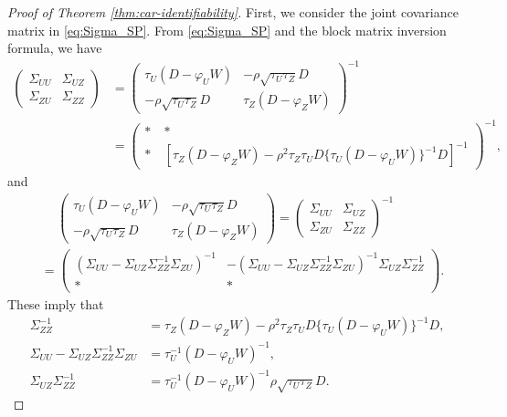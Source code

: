 \documentclass[11pt]{article}
\theoremstyle{definition}
\theoremstyle{remark}
\begin{document}
\begin{proof}[Proof of Theorem \ref{thm:car-identifiability}]
First, we consider the joint covariance matrix in \eqref{eq:Sigma_SP}. 
From \eqref{eq:Sigma_SP} and the block matrix inversion formula, we have 
\begin{align*}
\begin{pmatrix}
        \Sigma_{UU} & \Sigma_{UZ}\\
        \Sigma_{ZU} & \Sigma_{ZZ}
\end{pmatrix}
& = 
\begin{pmatrix} 
        \tau_U(D-\varphi_U W) & -\rho\sqrt{\tau_U\tau_Z} D \\
        -\rho\sqrt{\tau_U\tau_Z} D & \tau_Z(D-\varphi_Z W)
    \end{pmatrix}^{-1}\\
& = 
\begin{pmatrix} 
* \ & * \\
* \ & 
[ \tau_Z(D-\varphi_Z W) -  \rho^2\tau_Z\tau_U D \{ \tau_U(D-\varphi_U W) \}^{-1} D ]^{-1}
\end{pmatrix}^{-1},
\end{align*} 
and  
\begin{align*}
    & \quad \ 
    \begin{pmatrix} 
        \tau_U(D-\varphi_U W) & -\rho\sqrt{\tau_U\tau_Z} D \\
        -\rho\sqrt{\tau_U\tau_Z} D & \tau_Z(D-\varphi_Z W)
    \end{pmatrix}
    = 
    \begin{pmatrix}
        \Sigma_{UU} & \Sigma_{UZ}\\
        \Sigma_{ZU} & \Sigma_{ZZ}
    \end{pmatrix}^{-1}
    \\
    & = 
     \begin{pmatrix}
        (\Sigma_{UU} - \Sigma_{UZ} \Sigma_{ZZ}^{-1} \Sigma_{ZU} )^{-1} & - (\Sigma_{UU} - \Sigma_{UZ} \Sigma_{ZZ}^{-1} \Sigma_{ZU} )^{-1} \Sigma_{UZ} \Sigma_{ZZ}^{-1} \\
        *
         & 
         * 
    \end{pmatrix}.
\end{align*} 
These imply that 
\begin{align}
\label{eq:cond_dist_YZ_1}
    \Sigma_{ZZ}^{-1} 
    & = \tau_Z(D-\varphi_Z W) -  \rho^2\tau_Z\tau_U D \{ \tau_U(D-\varphi_U W) \}^{-1} D, 
    \\
\label{eq:cond_dist_YZ_2}
    \Sigma_{UU} - \Sigma_{UZ} \Sigma_{ZZ}^{-1} \Sigma_{ZU}
    & = \tau_U^{-1}(D-\varphi_U W)^{-1},
    \\
\label{eq:cond_dist_YZ_3}
    \Sigma_{UZ} \Sigma_{ZZ}^{-1} 
    & = 
    \tau_U^{-1}(D-\varphi_U W)^{-1} \rho\sqrt{\tau_U\tau_Z} D. 
\end{align}



\end{proof}
\end{document}
